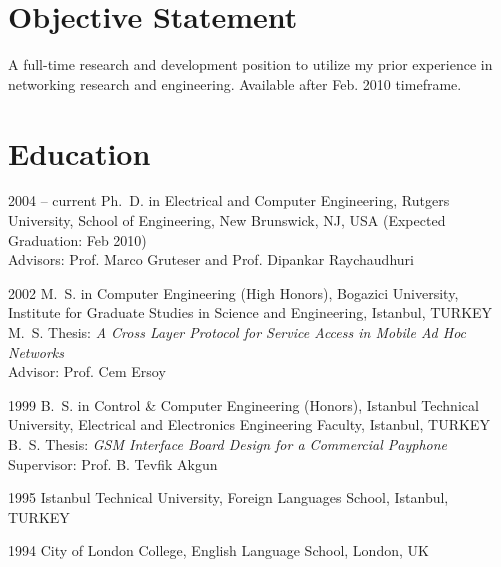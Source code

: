 \documentclass[10pt]{article}
\begin{document}
\section{Objective Statement}
\begin{CV}
\item A full-time research and development position to utilize my prior experience in networking research and
engineering. Available after Feb. 2010 timeframe.
\end{CV}


\section{Education}
\begin{CV}
\item[2004 -- current] Ph.~D. in Electrical and Computer Engineering, Rutgers
University, School of Engineering, New Brunswick, NJ, USA (Expected Graduation:
Feb 2010) \vspace{1mm}\\
Advisors: Prof. Marco Gruteser and Prof. Dipankar Raychaudhuri
\item[2002] M.~S. in Computer Engineering (High Honors), Bogazici University,
Institute for Graduate Studies in Science and Engineering, Istanbul, TURKEY
\vspace{1mm} \\
M.~S. Thesis: \emph{A Cross Layer Protocol for Service Access in Mobile Ad Hoc 
Networks} \\
Advisor: Prof. Cem Ersoy
\item[1999] B.~S. in Control \& Computer Engineering (Honors),
Istanbul Technical University, Electrical and Electronics Engineering
Faculty, Istanbul, TURKEY \vspace{1mm}\\
B.~S. Thesis: \emph{GSM Interface Board Design for a Commercial Payphone} \\
Supervisor: Prof. B. Tevfik Akgun
\item[1995] Istanbul Technical University, Foreign Languages School,
Istanbul, TURKEY
\item[1994] City of London College, English Language School, London, UK
\end{CV}
\end{document}
